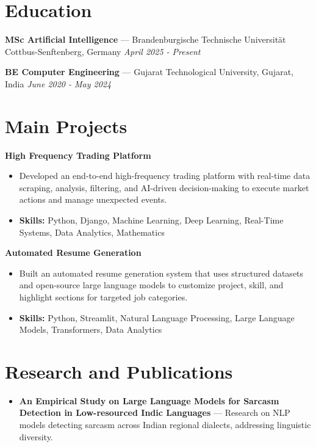 \documentclass[a4paper,10pt]{article}
\begin{document}
\section*{Education}
\textbf{MSc Artificial Intelligence} — Brandenburgische Technische Universität Cottbus-Senftenberg, Germany \hfill \textit{April 2025 - Present}\par
\vspace{1.5pt}
\textbf{BE Computer Engineering} — Gujarat Technological University, Gujarat, India \hfill \textit{June 2020 - May 2024}\par

\section*{Main Projects}
\textbf{High Frequency Trading Platform}\par
\vspace{1pt}
\begin{itemize}
  \item Developed an end-to-end high-frequency trading platform with real-time data scraping, analysis, filtering, and AI-driven decision-making to execute market actions and manage unexpected events.
  \item \textbf{Skills:} Python, Django, Machine Learning, Deep Learning, Real-Time Systems, Data Analytics, Mathematics
\end{itemize}
\vspace{3pt}
\textbf{Automated Resume Generation}\par
\vspace{1pt}
\begin{itemize}
  \item Built an automated resume generation system that uses structured datasets and open-source large language models to customize project, skill, and highlight sections for targeted job categories.
  \item \textbf{Skills:} Python, Streamlit, Natural Language Processing, Large Language Models, Transformers, Data Analytics
\end{itemize}

\section*{Research and Publications}
\begin{itemize}
\item \textbf{An Empirical Study on Large Language Models for Sarcasm Detection in Low-resourced Indic Languages} — Research on NLP models detecting sarcasm across Indian regional dialects, addressing linguistic diversity.
\end{itemize}
\end{document}
